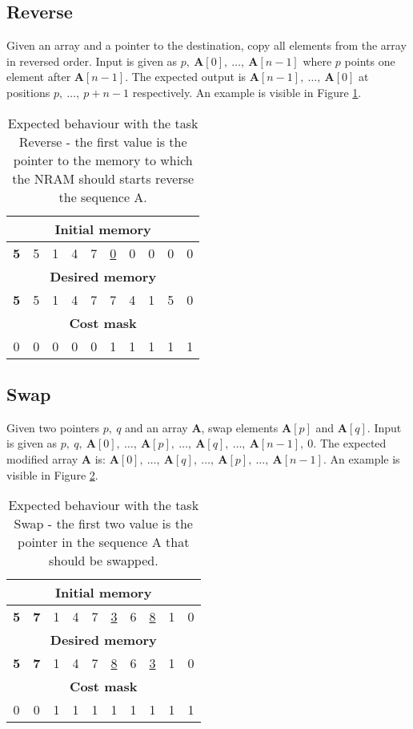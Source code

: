 \subsection{Reverse}
Given an array and a pointer to the destination, copy all elements from the array in reversed order. Input is given as $p,\ \textbf{A}[0],\ \dots,\ \textbf{A}[n-1]$ where $p$ points one element after $\textbf{A}[n-1]$. The expected output is $\textbf{A}[n-1],\ \dots,\ \textbf{A}[0]$ at positions $p,\ \dots,\ p+n-1$ respectively. An example is visible in Figure \ref{fig:reverse-example}.
\begin{table}[h!]
	\centering
	\begin{tabular}{|c|c|c|c|c|c|c|c|c|c|}
		\hline
		\multicolumn{10}{|c|}{\textbf{Initial memory}} \\ \hline
		\textbf{5} & 5 & 1 & 4 & 7 & \underline{0} & 0 & 0 & 0 & 0 \\ \hline\hline\hline
		\multicolumn{10}{|c|}{\textbf{Desired memory}} \\ \hline
		\textbf{5} & 5 & 1 & 4 & 7 & 7 & 4 & 1 & 5 & 0 \\ \hline\hline\hline
		\multicolumn{10}{|c|}{\textbf{Cost mask}} \\ \hline
		0 & 0 & 0 & 0 & 0 & 1 & 1 & 1 & 1 & 1 \\ \hline
	\end{tabular}
	\caption{Expected behaviour with the task Reverse - the first value is the pointer to the memory to which the NRAM should starts reverse the sequence A.}
	\label{fig:reverse-example}
\end{table}
\FloatBarrier
\iffalse
\subsection{Swap}
Given two pointers $p,\ q$ and an array \textbf{A}, swap elements $\textbf{A}[p]$ and $\textbf{A}[q]$. Input is given as $p,\ q,\ \textbf{A}[0],\ \dots,\ \textbf{A}[p],\ \dots,\ \textbf{A}[q],\ \dots,\ \textbf{A}[n-1],\ 0$. The expected modified array \textbf{A} is: $\textbf{A}[0],\ \dots,\ \textbf{A}[q],\ \dots,\ \textbf{A}[p],\ \dots,\ \textbf{A}[n-1]$. An example is visible in Figure \ref{fig:swap-example}.
\begin{table}[h!]
	\centering
	\begin{tabular}{|c|c|c|c|c|c|c|c|c|c|}
		\hline
		\multicolumn{10}{|c|}{\textbf{Initial memory}} \\ \hline
		\textbf{5} & \textbf{7} & 1 & 4 & 7 & \underline{3} & 6 & \underline{8} & 1 & 0 \\ \hline\hline\hline
		\multicolumn{10}{|c|}{\textbf{Desired memory}} \\ \hline
		\textbf{5} & \textbf{7} & 1 & 4 & 7 & \underline{8} & 6 & \underline{3} & 1 & 0 \\ \hline\hline\hline
		\multicolumn{10}{|c|}{\textbf{Cost mask}} \\ \hline
		0 & 0 & 1 & 1 & 1 & 1 & 1 & 1 & 1 & 1 \\ \hline
	\end{tabular}
	\caption{Expected behaviour with the task Swap - the first two value is the pointer in the sequence A that should be swapped.}
	\label{fig:swap-example}
\end{table}
\FloatBarrier

